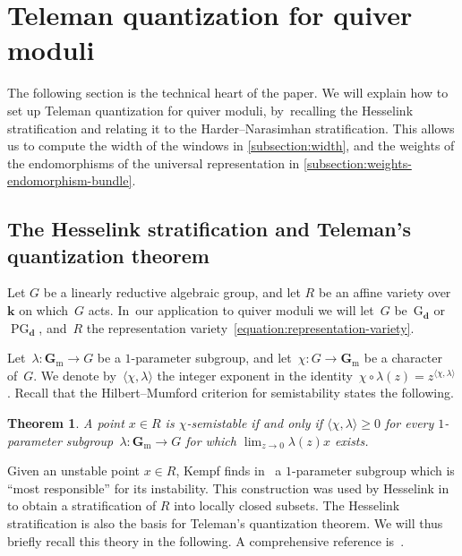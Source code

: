 \documentclass[11pt]{article}
\theoremstyle{plain}
\newtheorem{theorem}{Theorem}[section]
\theoremstyle{definition}
\DeclareMathOperator\PG{PG}
\newcommand\field{\mathbf{k}}
\newcommand\Gm{\ensuremath{\mathbf{G}_{\mathrm{m}}}}
\newcommand\group[1][\tuple{d}]{\mathrm{G}_{#1}}
\newcommand\tuple[1]{\ensuremath{{\boldsymbol{#1}}}}
\begin{document}
\section{Teleman quantization for quiver moduli}
\label{section:teleman-for-quiver-moduli}
The following section is the technical heart of the paper.
We will explain how to set up Teleman quantization for quiver moduli, by~recalling the Hesselink stratification
and relating it to the Harder--Narasimhan stratification.
This allows us to compute the width of the windows in \cref{subsection:width},
and the weights of the endomorphisms of the universal representation in \cref{subsection:weights-endomorphism-bundle}.

\subsection{The Hesselink stratification and Teleman's quantization theorem}
\label{subsection:hesselink-and-teleman}
Let $G$ be a linearly reductive algebraic group,
and let $R$ be an affine variety over $\field$ on which~$G$ acts. In~our application to quiver moduli we will let~$G$ be~$\group$ or~$\PG_{\tuple{d}}$,
and~$R$ the representation variety~\eqref{equation:representation-variety}.

Let~$\lambda\colon\Gm\to G$ be a $1$-parameter subgroup,
and let~$\chi\colon G \to \Gm$ be a character of~$G$.
We denote by~$\langle\chi,\lambda\rangle$ the integer exponent in the identity~$\chi \circ \lambda (z) = z^{\langle\chi,\lambda\rangle}$.
Recall that the Hilbert--Mumford criterion for semistability states the following.

\begin{theorem}
\label{theorem:hilbert-mumford}
A point $x \in R$ is $\chi$-semistable if and only if $ \langle\chi,\lambda\rangle \geq 0$
for every $1$-parameter subgroup~$\lambda\colon \Gm \to G$
for which $\lim_{z \to 0} \lambda(z)x$ exists.
\end{theorem}
Given an unstable point $x \in R$, Kempf finds in~\cite{MR0506989} a $1$-parameter subgroup which is
``most responsible'' for its instability.
This construction was used by Hesselink in~\cite{MR0514673}
to obtain a stratification of $R$ into locally closed subsets.
The Hesselink stratification is also the basis for Teleman's quantization theorem.
We will thus briefly recall this theory in the following.
A comprehensive reference is~\cite[\S 12 \& \S 13]{MR0766741}.
\end{document}
